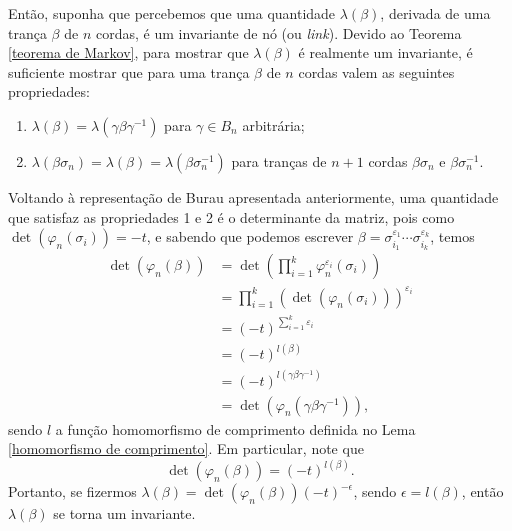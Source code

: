 	\par\vspace{0.3cm} Então, suponha que percebemos que uma quantidade $\lambda(\beta)$, 
	derivada de uma trança $\beta$ de $n$ cordas, é um invariante de nó (ou \textit{link}). 
	Devido ao Teorema \ref{teorema de Markov}, para mostrar que $\lambda(\beta)$ é realmente 
	um invariante, é suficiente mostrar que para uma trança $\beta$ de $n$ cordas valem as 
	seguintes propriedades:
	\begin{enumerate}
		\item $\lambda(\beta) = \lambda(\gamma\beta\gamma^{-1})$ para $\gamma\in B_n$ arbitrária;
		\item $\lambda(\beta\sigma_n) = \lambda(\beta) = \lambda(\beta\sigma_n^{-1})$ 
		para tranças de $n+1$ cordas $\beta\sigma_n$ e $\beta\sigma_n^{-1}$.
	\end{enumerate}
	Voltando à representação de Burau apresentada anteriormente, uma quantidade que 
	satisfaz as propriedades 1 e 2 é o determinante da matriz, pois como $\det(\varphi_n(\sigma_i)) = -t$,
	e sabendo que podemos escrever $\beta = \sigma_{i_1}^{\varepsilon_1}\cdots\sigma_{i_k}^{\varepsilon_k}$, 
	temos
	\begin{align*} 
    	\det(\varphi_n(\beta)) 
    	&= 
    	\det\left( \prod_{i=1}^{k}\varphi_n^{\varepsilon_i}(\sigma_i) \right)
    	\\ 
    	&= \prod_{i=1}^{k}(\det(\varphi_n(\sigma_i)))^{\varepsilon_i}
    	\\ 
    	&= (-t)^{\sum_{i=1}^{k}\varepsilon_i}
    	\\
    	&=(-t)^{l(\beta)} 
    	\\
    	&=(-t)^{l(\gamma\beta\gamma^{-1})} 
    	\\
    	&=\det(\varphi_n(\gamma\beta\gamma^{-1})),
	\end{align*}
	sendo $l$ a função homomorfismo de comprimento definida no Lema \ref{homomorfismo de comprimento}. 
	Em particular, note que
	\begin{equation}
	\label{det Burau de beta}
	    \det(\varphi_n(\beta)) = (-t)^{l(\beta)}.
	\end{equation}
	Portanto, se fizermos $\lambda(\beta) = \det(\varphi_n(\beta))(-t)^{-\epsilon}$, 
	sendo $\epsilon=l(\beta)$, então $\lambda(\beta)$ se torna um invariante.
	
